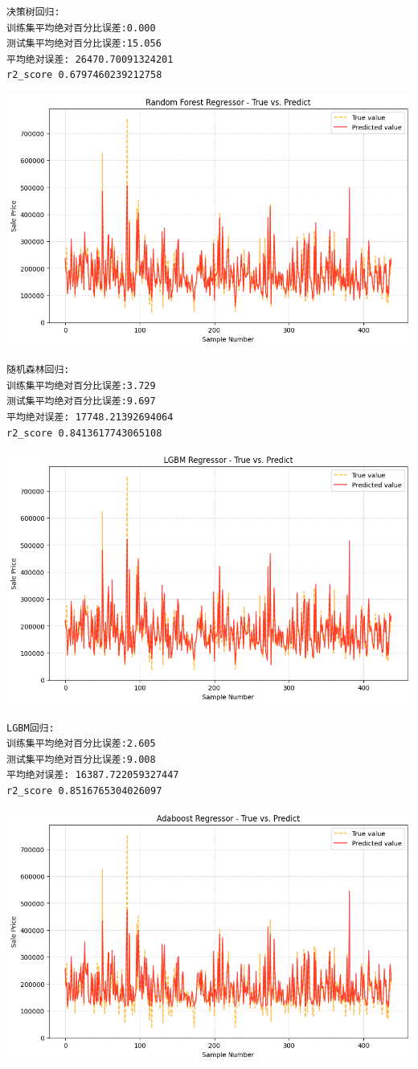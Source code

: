 \documentclass[a4paper,12pt]{article}
\begin{document}
\begin{lstlisting}
决策树回归:
训练集平均绝对百分比误差:0.000
测试集平均绝对百分比误差:15.056
平均绝对误差: 26470.70091324201
r2_score 0.6797460239212758
\end{lstlisting}

\centering
\includegraphics[width=0.75\linewidth]{images/kaggle_RandomForests.png}
\justifying

\begin{lstlisting}
随机森林回归:
训练集平均绝对百分比误差:3.729
测试集平均绝对百分比误差:9.697
平均绝对误差: 17748.21392694064
r2_score 0.8413617743065108
\end{lstlisting}


\centering
\includegraphics[width=0.75\linewidth]{images/kaggle_LGBM.png}
\justifying



\begin{lstlisting}
LGBM回归:
训练集平均绝对百分比误差:2.605
测试集平均绝对百分比误差:9.008
平均绝对误差: 16387.722059327447
r2_score 0.8516765304026097
\end{lstlisting}



\centering
\includegraphics[width=0.75\linewidth]{images/kaggle_Adaboost.png}
\justifying
\end{document}
